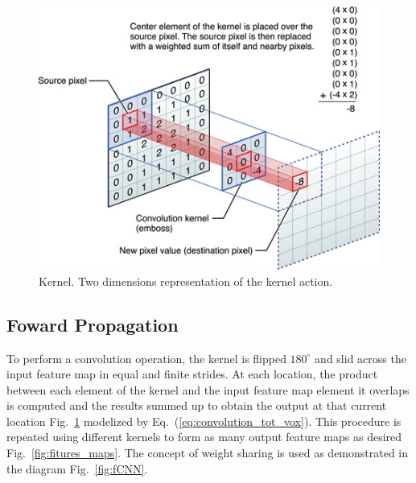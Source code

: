 \documentclass[final, paper=letter,5p,times,twocolumn]{elsarticle}
\begin{document}
\begin{figure}[htbp]
   \begin{center}
      \includegraphics[scale=0.3, angle=0]{images/GvsBA.jpg}
   \end{center}
   \caption{Kernel. Two dimensions representation of the kernel action.}
  \label{fig:Kernel} 
\end{figure}



\subsection{Foward Propagation}

To perform a convolution operation, the kernel is flipped $180^{\circ}$ and slid across the input feature map in equal and finite strides. At each location, the product between each element of the kernel and the input feature map element it overlaps is computed and the results summed up to obtain the output at that current location Fig.~\ref{fig:Kernel} modelized by Eq.~(\ref{eq:convolution_tot_vox}). This procedure is repeated using different kernels to form as many output feature maps as desired Fig.~\ref{fig:fitures_maps}. The concept of weight sharing is used as demonstrated in the diagram Fig.~\ref{fig:fCNN}.
\end{document}
